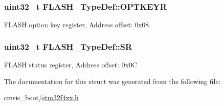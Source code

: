 \subsubsection[{\texorpdfstring{O\+P\+T\+K\+E\+YR}{OPTKEYR}}]{ uint32\+\_\+t F\+L\+A\+S\+H\+\_\+\+Type\+Def\+::\+O\+P\+T\+K\+E\+YR}\hypertarget{struct_f_l_a_s_h___type_def_a793cd13a4636c9785fdb99316f7fd7ab}{}\label{struct_f_l_a_s_h___type_def_a793cd13a4636c9785fdb99316f7fd7ab}
F\+L\+A\+SH option key register, Address offset\+: 0x08 
\subsubsection[{\texorpdfstring{SR}{SR}}]{ uint32\+\_\+t F\+L\+A\+S\+H\+\_\+\+Type\+Def\+::\+SR}\hypertarget{struct_f_l_a_s_h___type_def_a52c4943c64904227a559bf6f14ce4de6}{}\label{struct_f_l_a_s_h___type_def_a52c4943c64904227a559bf6f14ce4de6}
F\+L\+A\+SH status register, Address offset\+: 0x0C 

The documentation for this struct was generated from the following file\+:\begin{DoxyCompactItemize}
\item 
cmsis\+\_\+boot/\hyperlink{stm32f4xx_8h}{stm32f4xx.\+h}\end{DoxyCompactItemize}
